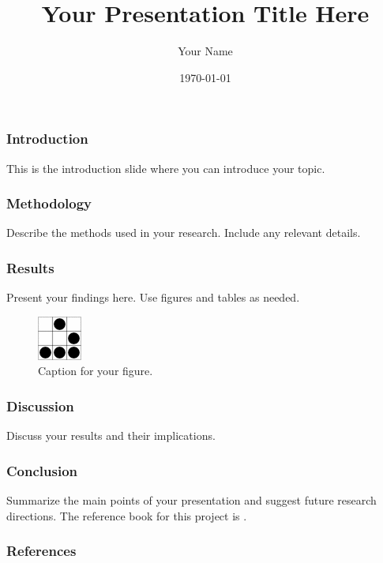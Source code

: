 \documentclass{beamer}
\title{Your Presentation Title Here}
\author{Your Name}
\date{\today}
\institute{Your Institution}
\begin{document}
\frame{\titlepage}

\begin{frame}
    \frametitle{Introduction}
    This is the introduction slide where you can introduce your topic.
\end{frame}

\begin{frame}
    \frametitle{Methodology}
    Describe the methods used in your research. Include any relevant details.
\end{frame}

\begin{frame}
    \frametitle{Results}
    Present your findings here. Use figures and tables as needed.
    
    \begin{figure}[htbp]
        \centering
        \includegraphics[width=0.3\linewidth]{Templates/logo.png}
        \caption{Caption for your figure.}
        \label{fig:example}
    \end{figure}
\end{frame}

\begin{frame}
    \frametitle{Discussion}
    Discuss your results and their implications.
\end{frame}

\begin{frame}
    \frametitle{Conclusion}
    Summarize the main points of your presentation and suggest future research directions. The reference book for this project is \cite{lamport1985i1}.
\end{frame}

\begin{frame}[allowframebreaks]
    \frametitle{References}
    
\end{frame}
\end{document}
